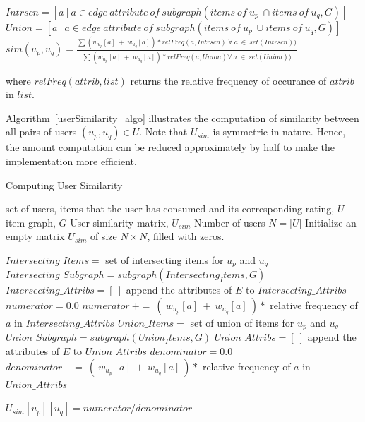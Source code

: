 \documentclass{acm_proc_article-sp}
\begin{document}
$Intrscn = [a\ |\ a \in edge\ attribute\ of\ subgraph(items\ of\ u_p\ \cap items\ of\ u_q, G)]$\\
\newline
$Union = [a\ |\ a \in edge\ attribute\ of\ subgraph(items\ of\ u_p\ \cup items\ of\ u_q, G)]$\\
\newline
$sim(u_p, u_q) = \frac{\sum (w_{u_p}[a]\ +\ w_{u_q}[a])*relFreq(a, Intrscn)\ \forall\ a\ \in\ set(Intrscn))}{\sum (w_{u_p}[a]\ +\ w_{u_q}[a])*relFreq(a, Union) \forall\ a\ \in\ set(Union))}$

where $relFreq(attrib, list)$ returns the relative frequency of occurance of $attrib$ in $list$.

Algorithm~\ref{userSimilarity_algo} illustrates the computation of similarity between all pairs of users $(u_p, u_q) \in U$. Note that $U_{sim}$ is symmetric in nature. Hence, the amount computation can be reduced approximately by half to make the implementation more efficient.

\begin{algorithm}
\label{userSimilarity_algo}
\caption{Computing User Similarity}
\begin{algorithmic}[1]
\renewcommand{\algorithmicrequire}{\textbf{Input:}}
\renewcommand{\algorithmicensure}{\textbf{Output:}}

\REQUIRE set of users, items that the user has consumed and its corresponding rating, $U$\\
item graph, $G$
\ENSURE User similarity matrix, $U_{sim}$
\STATE Number of users $N = |U|$
\STATE Initialize an empty matrix $U_{sim}$ of size $N\times N$, filled with zeros.
    
    \STATE $Intersecting\_Items = $ set of intersecting items for $u_p$ and $u_q$
    \STATE $Intersecting\_Subgraph = subgraph(Intersecting_Items, G)$
    \STATE $Intersecting\_Attribs = [\ ]$
      \STATE append the attributes of $E$ to $Intersecting\_Attribs$
    \ENDFOR
    \STATE $numerator = 0.0$
      \STATE $numerator\ +=\ (\ w_{u_p}[a]\ +\ w_{u_q}[a]\ ) *$ relative frequency of $a$ in $Intersecting\_Attribs$
    \ENDFOR
    \newline
    \STATE $Union\_Items = $ set of union of items for $u_p$ and $u_q$
    \STATE $Union\_Subgraph = subgraph(Union_Items, G)$
    \STATE $Union\_Attribs = [\ ]$
      \STATE append the attributes of $E$ to $Union\_Attribs$
    \ENDFOR
    \STATE $denominator = 0.0$
      \STATE $denominator\ +=\ (\ w_{u_p}[a]\ +\ w_{u_q}[a]\ ) *$ relative frequency of $a$ in $Union\_Attribs$
    \ENDFOR
    
    \STATE $U_{sim}[u_p][u_q] = numerator / denominator$
    
  \ENDFOR
\ENDFOR
\end{algorithmic}
\end{algorithm}
\end{document}
